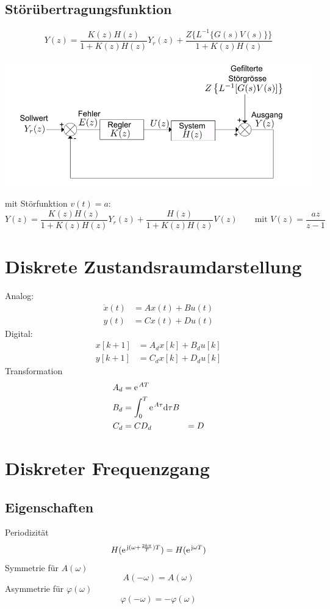 \subsection{Störübertragungsfunktion}
\[
	Y(z) = \frac{K(z)H(z)}{1+K(z)H(z)}Y_r(z)+\frac{Z\{L^{-1}\{G(s)V(s)\}\}}{1+K(z)H(z)}
\]
\begin{center}
	\includegraphics[width=.8\textwidth]{./images/storueb}
\end{center}

mit Störfunktion $v(t) = a$:
\[
	Y(z) = \frac{K(z)H(z)}{1+K(z)H(z)}Y_r(z)+\frac{H(z)}{1+K(z)H(z)}V(z) \qquad \textrm{mit } V(z) = \frac{az}{z-1}
\]

\section{Diskrete Zustandsraumdarstellung}
Analog:
\[\begin{aligned}
	\dot{x}(t) &= Ax(t) + Bu(t)\\
	y(t) &= Cx(t) + Du(t)
\end{aligned}\]
Digital:
\[\begin{aligned}
	x[k+1] &= A_dx[k] + B_du[k]\\
	y[k+1] &= C_dx[k] + D_du[k]
\end{aligned}\]
Transformation
\[\begin{aligned}
	A_d &= \mathrm{e\;\!}^{AT}\\
	B_d &= \int_{0}^{T}\mathrm{e\;\!}^{A\tau}\mathrm{d}\tau B\\
	C_d &= C
	D_d &= D
\end{aligned}\]

\section{Diskreter Frequenzgang}
\subsection{Eigenschaften}
Periodizität
\[
	H(\mathrm{e\;\!}^{\mathrm{j}(\omega+\frac{2k\pi}{T})T})=H(\mathrm{e\;\!}^{\mathrm{j}\omega T})
\]
Symmetrie für $A(\omega)$
\[
	A(-\omega) = A(\omega)
\]
Asymmetrie für $\varphi(\omega)$
\[
	\varphi(-\omega) = -\varphi(\omega)
\]

